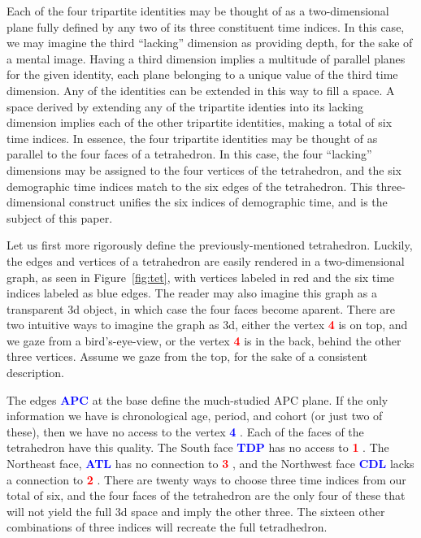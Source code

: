 \documentclass[11pt,oneside]{article} %
\newcommand\vt[1]{%
 \textcolor{red}{\textbf{#1}\hspace{-.3em}}
}
\newcommand\eg[1]{%
 \textcolor{blue}{\textbf{#1}\hspace{-.3em}}
}
\begin{document}
Each of the four tripartite identities may be thought of as a
two-dimensional plane fully defined by any two of its three constituent time
indices.
In this case, we may imagine the third ``lacking'' dimension as providing
depth, for the sake of a mental image.
Having a third dimension implies a multitude of parallel planes for the given identity, each plane
belonging to a unique value of the third time dimension. Any of the
identities can be extended in this way to fill a space. A space derived by
extending any of the tripartite identies into its lacking dimension implies each of the
other tripartite identities, making a total of six time indices. In essence, the
four tripartite identities may be thought of as parallel to the four faces of a
tetrahedron. In this case, the four ``lacking'' dimensions may be assigned to
the four vertices of the tetrahedron, and the six demographic time indices match
to the six edges of the tetrahedron. This three-dimensional construct
unifies the six indices of demographic time, and is the subject of this paper.

Let us first more rigorously define the previously-mentioned tetrahedron.
Luckily, the edges and vertices of a tetrahedron are easily rendered in a
two-dimensional graph, as seen in Figure~\ref{fig:tet}, with vertices labeled
in red and the six time indices labeled as blue edges.
The reader may also imagine this graph as a transparent 3d object, in which case the four faces
become aparent. There are two intuitive ways to imagine the graph as 3d, either
the vertex \vt{4} is on top, and we gaze from a bird's-eye-view, or the
vertex \vt{4} is in the back, behind the other three vertices. Assume we
gaze from the top, for the sake of a consistent description. 

The edges \eg{APC} at the base define the much-studied APC plane. If the only
information we have is chronological age, period, and cohort (or just two of
these), then we have no access to the vertex \eg{4}. Each of the faces of the
tetrahedron have this quality. The South face \eg{TDP} has no access to \vt{1}.
The Northeast face, \eg{ATL} has no connection to \vt{3}, and the Northwest face
\eg{CDL} lacks a connection to \vt{2}. There are twenty ways to choose three
time indices from our total of six, and the four faces of the tetrahedron are
the only four of these that will not yield the full 3d space and imply the other
three. The sixteen other combinations of three indices will recreate the full
tetradhedron.
\end{document}
